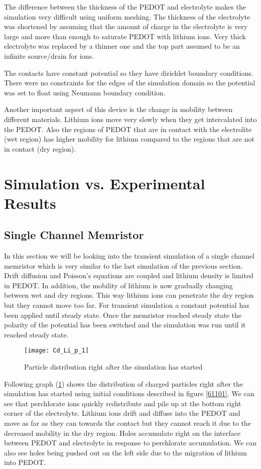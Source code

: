 The difference between the thickness of the PEDOT and electrolyte makes the simulation very difficult using uniform meshing. The thickness of the electrolyte was shortened by assuming that the amount of charge in the electrolyte is very large and more than enough to saturate PEDOT with lithium ions. Very thick electrolyte was replaced by a thinner one and the top part assumed to be an infinite source/drain for ions.

The contacts have constant potential so they have dirichlet boundary conditions. There were no constraints for the edges of the simulation domain so the potential was set to float using Neumann boundary condition.

Another important aspect of this device is the change in mobility between different materials. Lithium ions move very slowly when they get intercalated into the PEDOT. Also the regions of PEDOT that are in contact with the electrolite (wet region) has higher mobility for lithium compared to the regions that are not in contact (dry region).


\clearpage
\section{Simulation vs. Experimental Results}

\subsection{Single Channel Memristor}

In this section we will be looking into the transient simulation of a single channel memristor which is very similar to the last simulation of the previous section. Drift diffusion and Poisson's equations are coupled and lithium density is limited in PEDOT. In addition, the mobility of lithium is now gradually changing between wet and dry regions. This way lithium ions can penetrate the dry region but they cannot move too far. For transient simulation a constant potential has been applied until steady state. Once the memristor reached steady state the polarity of the potential has been switched and the simulation was run until it reached steady state. 

\begin{figure}[!htp]
\centering
\texttt{[image: Cd\_Li\_p\_1]}
\caption{Particle distribution right after the simulation has started} 
\label{Cd_Li_p_1}
\end{figure}

Following graph (\ref{Cd_Li_p_1}) shows the distribution of charged particles right after the simulation has started using initial conditions described in figure \ref{61101}. We can see that perchlorate ions quickly redistribute and pile up at the bottom right corner of the electrolyte. Lithium ions drift and diffuse into the PEDOT and move as far as they can towards the contact but they cannot reach it due to the decreased mobility in the dry region. Holes accumulate right on the interface between PEDOT and electrolyte in response to perchlorate accumulation. We can also see holes being pushed out on the left side due to the migration of lithium into PEDOT. 

